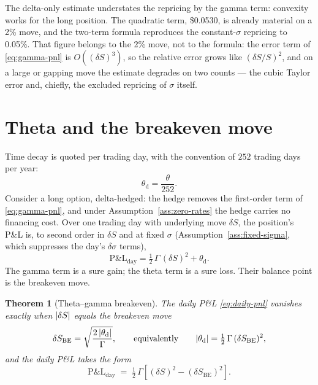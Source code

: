 \documentclass[11pt]{book}
\theoremstyle{plain}
\newtheorem{theorem}{Theorem}[chapter]
\theoremstyle{definition}
\theoremstyle{remark}
\DeclarePairedDelimiter{\abs}{\lvert}{\rvert}
\begin{document}
The delta-only estimate understates the repricing by the gamma term: convexity works for the long position. The quadratic term, \$0.0530, is already material on a 2\% move, and the two-term formula reproduces the constant-$\sigma$ repricing to 0.05\%. That figure belongs to the 2\% move, not to the formula: the error term of \eqref{eq:gamma-pnl} is $O\!\left((\delta S)^3\right)$, so the relative error grows like $(\delta S/S)^2$, and on a large or gapping move the estimate degrades on two counts --- the cubic Taylor error and, chiefly, the excluded repricing of $\sigma$ itself.

\section{Theta and the breakeven move}
\label{sec:theta-gamma}

Time decay is quoted per trading day, with the convention of $252$ trading days per year:
\begin{equation}
\theta_{\mathrm d} = \frac{\theta}{252}.
\label{eq:theta-daily}
\end{equation}
Consider a long option, delta-hedged: the hedge removes the first-order term of \eqref{eq:gamma-pnl}, and under Assumption~\ref{ass:zero-rates} the hedge carries no financing cost. Over one trading day with underlying move $\delta S$, the position's P\&L is, to second order in $\delta S$ and at fixed $\sigma$ (Assumption~\ref{ass:fixed-sigma}, which suppresses the day's $\delta\sigma$ terms),
\begin{equation}
\mathrm{P\&L}_{\mathrm{day}} = \tfrac12\,\Gamma\,(\delta S)^2 + \theta_{\mathrm d}.
\label{eq:daily-pnl}
\end{equation}
The gamma term is a sure gain; the theta term is a sure loss. Their balance point is the breakeven move.

\begin{theorem}[Theta--gamma breakeven]
\label{thm:breakeven}
The daily P\&L \eqref{eq:daily-pnl} vanishes exactly when $\abs{\delta S}$ equals the breakeven move
\begin{equation}
\delta S_{\mathrm{BE}} = \sqrt{\frac{2\,\abs{\theta_{\mathrm d}}}{\Gamma}},
\qquad\text{equivalently}\qquad
\abs{\theta_{\mathrm d}} = \tfrac12\,\Gamma\,(\delta S_{\mathrm{BE}})^2,
\label{eq:breakeven}
\end{equation}
and the daily P\&L takes the form
\begin{equation}
\boxed{\;\mathrm{P\&L}_{\mathrm{day}} \;=\; \tfrac12\,\Gamma\left[(\delta S)^2 - (\delta S_{\mathrm{BE}})^2\right].\;}
\label{eq:gamma-theta-pnl}
\end{equation}
\end{theorem}
\end{document}
